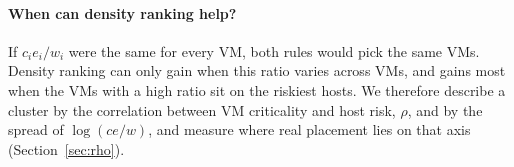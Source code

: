 \paragraph{When can density ranking help?}
If $c_i e_i / w_i$ were the same for every VM, both rules would pick the same VMs. Density
ranking can only gain when this ratio varies across VMs, and gains most when the VMs with a
high ratio sit on the riskiest hosts. We therefore describe a cluster by the correlation between
VM criticality and host risk, $\rho$, and by the spread of $\log(c e / w)$, and measure where real
placement lies on that axis (Section~\ref{sec:rho}).
